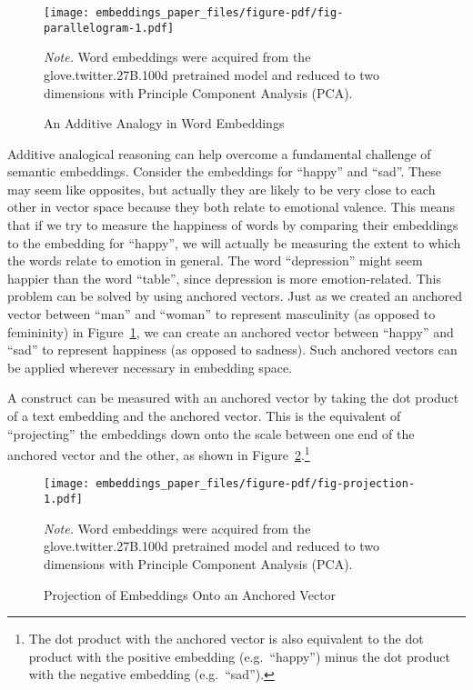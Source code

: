 \documentclass[
  man,
  floatsintext,
  longtable,
  nolmodern,
  notxfonts,
  notimes,
  colorlinks=true,linkcolor=blue,citecolor=blue,urlcolor=blue]{apa7}
\begin{document}
\begin{figure}[!htbp]

{\caption{{An Additive Analogy in Word
Embeddings}{\label{fig-parallelogram}}}}

\texttt{[image: embeddings\_paper\_files/figure-pdf/fig-parallelogram-1.pdf]}

{\noindent \emph{Note.} Word embeddings were acquired from the
glove.twitter.27B.100d pretrained model and reduced to two dimensions
with Principle Component Analysis (PCA).}

\end{figure}

Additive analogical reasoning can help overcome a fundamental challenge
of semantic embeddings. Consider the embeddings for ``happy'' and
``sad''. These may seem like opposites, but actually they are likely to
be very close to each other in vector space because they both relate to
emotional valence. This means that if we try to measure the happiness of
words by comparing their embeddings to the embedding for ``happy'', we
will actually be measuring the extent to which the words relate to
emotion in general. The word ``depression'' might seem happier than the
word ``table'', since depression is more emotion-related. This problem
can be solved by using anchored vectors. Just as we created an anchored
vector between ``man'' and ``woman'' to represent masculinity (as
opposed to femininity) in Figure~\ref{fig-parallelogram}, we can create
an anchored vector between ``happy'' and ``sad'' to represent happiness
(as opposed to sadness). Such anchored vectors can be applied wherever
necessary in embedding space.

A construct can be measured with an anchored vector by taking the dot
product of a text embedding and the anchored vector. This is the
equivalent of ``projecting'' the embeddings down onto the scale between
one end of the anchored vector and the other, as shown in
Figure~\ref{fig-projection}.\footnote{The dot product with the anchored
  vector is also equivalent to the dot product with the positive
  embedding (e.g.~``happy'') minus the dot product with the negative
  embedding (e.g.~``sad'').}

\begin{figure}[!htbp]

{\caption{{Projection of Embeddings Onto an Anchored
Vector}{\label{fig-projection}}}}

\texttt{[image: embeddings\_paper\_files/figure-pdf/fig-projection-1.pdf]}

{\noindent \emph{Note.} Word embeddings were acquired from the
glove.twitter.27B.100d pretrained model and reduced to two dimensions
with Principle Component Analysis (PCA).}

\end{figure}
\end{document}
